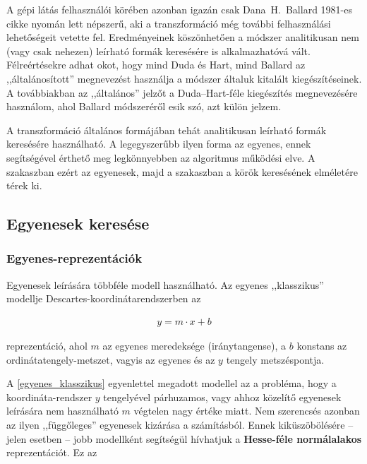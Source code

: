 A gépi látás felhasználói körében azonban igazán csak Dana~H.~Ballard 1981-es cikke \cite{hough_ballard} nyomán lett népszerű, aki a transzformáció még további felhasználási lehetőségeit vetette fel. Eredményeinek köszönhetően a módszer analitikusan nem (vagy csak nehezen) leírható formák keresésére is alkalmazhatóvá vált. Félreértésekre adhat okot, hogy mind Duda és Hart, mind Ballard az ,,általánosított'' megnevezést használja a módszer általuk kitalált kiegészítéseinek. A továbbiakban az ,,általános'' jelzőt a Duda--Hart-féle kiegészítés megnevezésére használom, ahol Ballard módszeréről esik szó, azt külön jelzem.

\bigskip

A transzformáció általános formájában tehát analitikusan leírható formák keresésére használható. A legegyszerűbb ilyen forma az egyenes, ennek segítségével érthető meg legkönnyebben az algoritmus működési elve. A  szakaszban ezért az egyenesek, majd a  szakaszban a körök keresésének elméletére térek ki.

\subsection{Egyenesek keresése}\label{sect:egyenesek_keresese}

\subsubsection{Egyenes-reprezentációk}\label{sect:egyenes_reprezentaciok}

Egyenesek leírására többféle modell használható. Az egyenes ,,klasszikus'' modellje Descartes-koordinátarendszerben az

\begin{align}\label{eq:egyenes_klasszikus}
y = m \cdot x + b
\end{align}

reprezentáció, ahol $ m $ az egyenes meredeksége (iránytangense), a $ b $ konstans az ordinátatengely-metszet, vagyis az egyenes és az $ y $ tengely metszéspontja.

A \eqref{egyenes_klasszikus} egyenlettel megadott modellel az a probléma, hogy a koordináta-rendszer $ y $ tengelyével párhuzamos, vagy ahhoz közelítő egyenesek leírására nem használható $ m $ végtelen nagy értéke miatt. Nem szerencsés azonban az ilyen ,,függőleges'' egyenesek kizárása a számításból. Ennek kiküszöbölésére -- jelen esetben -- jobb modellként segítségül hívhatjuk a \textbf{Hesse-féle normálalakos} reprezentációt. Ez az

